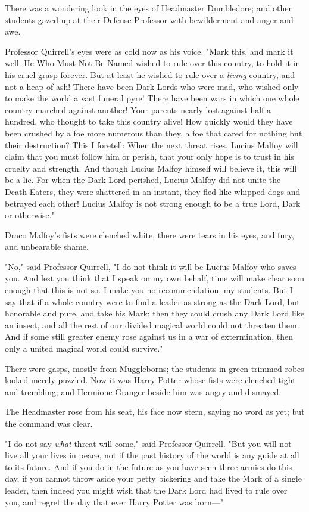 There was a wondering look in the eyes of Headmaster Dumbledore; and other
students gazed up at their Defense Professor with bewilderment and anger and
awe.

Professor Quirrell's eyes were as cold now as his voice. "Mark this, and mark
it well. He-Who-Must-Not-Be-Named wished to rule over this country, to hold it
in his cruel grasp forever. But at least he wished to rule over a \emph{living}
country, and not a heap of ash! There have been Dark Lords who were mad, who
wished only to make the world a vast funeral pyre! There have been wars in
which one whole country marched against another! Your parents nearly lost
against half a hundred, who thought to take this country alive! How quickly
would they have been crushed by a foe more numerous than they, a foe that cared
for nothing but their destruction? This I foretell: When the next threat rises,
Lucius Malfoy will claim that you must follow him or perish, that your only
hope is to trust in his cruelty and strength. And though Lucius Malfoy himself
will believe it, this will be a lie. For when the Dark Lord perished, Lucius
Malfoy did not unite the Death Eaters, they were shattered in an instant, they
fled like whipped dogs and betrayed each other! Lucius Malfoy is not strong
enough to be a true Lord, Dark or otherwise."

Draco Malfoy's fists were clenched white, there were tears in his eyes, and
fury, and unbearable shame.

"No," said Professor Quirrell, "I do not think it will be Lucius Malfoy who
saves you. And lest you think that I speak on my own behalf, time will make
clear soon enough that this is not so. I make you no recommendation, my
students. But I say that if a whole country were to find a leader as strong as
the Dark Lord, but honorable and pure, and take his Mark; then they could crush
any Dark Lord like an insect, and all the rest of our divided magical world
could not threaten them. And if some still greater enemy rose against us in a
war of extermination, then only a united magical world could survive."

There were gasps, mostly from Muggleborns; the students in green-trimmed robes
looked merely puzzled. Now it was Harry Potter whose fists were clenched tight
and trembling; and Hermione Granger beside him was angry and dismayed.

The Headmaster rose from his seat, his face now stern, saying no word as yet;
but the command was clear.

"I do not say \emph{what} threat will come," said Professor Quirrell. "But you
will not live all your lives in peace, not if the past history of the world is
any guide at all to its future. And if you do in the future as you have seen
three armies do this day, if you cannot throw aside your petty bickering and
take the Mark of a single leader, then indeed you might wish that the Dark Lord
had lived to rule over you, and regret the day that ever Harry Potter was
born\mbox{---}"

